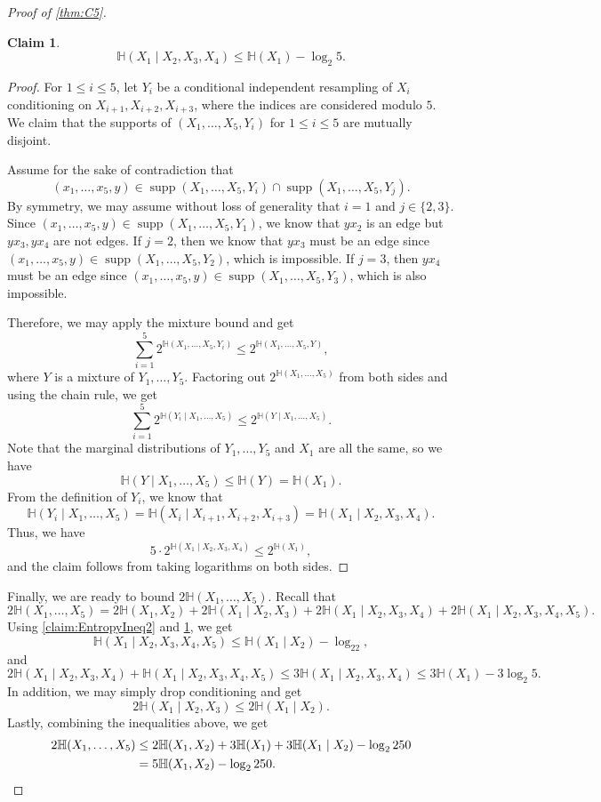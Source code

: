 \documentclass[reqno,11pt]{amsart}
\numberwithin{equation}{section}
\newtheorem{claim}[theorem]{Claim}
\theoremstyle{definition}
\theoremstyle{remark}
\DeclareMathOperator{\supp}{supp}
\newcommand{\HH}{\mathbb{H}}
\begin{document}
\begin{proof}[Proof of \cref{thm:C5}]
\begin{claim}\label{claim:EntropyIneq1}
    \[\HH(X_1\mid X_2,X_3,X_4)\leq \HH(X_1)-\log_2 5.\]
\end{claim}
\begin{proof}
    For $1\leq i\leq 5$, let $Y_i$ be a conditional independent resampling of $X_i$ conditioning on $X_{i+1},X_{i+2},X_{i+3}$, where the indices are considered modulo $5$.
    We claim that the supports of $(X_1,\dots,X_5,Y_i)$ for $1\leq i\leq 5$ are mutually disjoint. 
        
    Assume for the sake of contradiction that 
    \[(x_1,\dots,x_5,y)\in \supp(X_1,\dots,X_5,Y_i)\cap\supp(X_1,\dots,X_5,Y_j).\]
    By symmetry, we may assume without loss of generality that $i=1$ and $j\in\{2,3\}$. Since $(x_1,\dots,x_5,y)\in \supp(X_1,\dots,X_5,Y_1)$, we know that $yx_2$ is an edge but $yx_3,yx_4$ are not edges. If $j=2$, then we know that $yx_3$ must be an edge since $(x_1,\dots,x_5,y)\in \supp(X_1,\dots,X_5,Y_2)$, which is impossible. If $j=3$, then $yx_4$ must be an edge since $(x_1,\dots,x_5,y)\in \supp(X_1,\dots,X_5,Y_3)$, which is also impossible.

    

    Therefore, we may apply the mixture bound and get 
    \[\sum_{i=1}^5 2^{\HH( X_1,\dots,X_5,Y_i)}\leq 2^{\HH( X_1,\dots,X_5,Y)},\]
    where $Y$ is a mixture of $Y_1,\dots,Y_5$. Factoring out $2^{\HH( X_1,\dots,X_5)}$ from both sides and using the chain rule, we get
    \[\sum_{i=1}^5 2^{\HH(Y_i\mid X_1,\dots,X_5)}\leq 2^{\HH(Y\mid X_1,\dots,X_5)}.\]
    Note that the marginal distributions of $Y_1,\dots,Y_5$ and $X_1$ are all the same, so we have 
    \[\HH(Y\mid X_1,\dots,X_5)\leq \HH(Y)=\HH(X_1).\]
    From the definition of $Y_i$, we know that 
    \[\HH(Y_i\mid X_1,\dots,X_5)=\HH(X_i\mid X_{i+1},X_{i+2},X_{i+3})=\HH(X_1\mid X_2,X_3,X_4).\]
    Thus, we have
    \[5\cdot 2^{\HH(X_1\mid X_2,X_3,X_4)}\leq 2^{\HH(X_1)},\]
    and the claim follows from taking logarithms on both sides.
\end{proof}


Finally, we are ready to bound $2\HH(X_1,\dots,X_5)$. 
Recall that
\[2\HH(X_1,\dots,X_5)=2\HH(X_1,X_2)+2\HH(X_1\mid X_2,X_3)+2\HH(X_1\mid X_2,X_3,X_4)+2\HH(X_1\mid X_2,X_3,X_4,X_5).\]
Using \cref{claim:EntropyIneq2} and \cref{claim:EntropyIneq1}, we get
\[\HH(X_1\mid X_2,X_3,X_4,X_5)\leq \HH(X_1\mid X_2)-\log_22,\]
and
\[2\HH(X_1\mid X_2,X_3,X_4)+\HH(X_1\mid X_2,X_3,X_4,X_5)\leq 3\HH(X_1\mid X_2,X_3,X_4)\leq 3\HH(X_1)-3\log_2 5.\]
In addition, we may simply drop conditioning and get
\[2\HH(X_1\mid X_2,X_3)\leq 2\HH(X_1\mid X_2).\]
Lastly, combining the inequalities above, we get 
\begin{align*}
    2\HH(X_1,\dots,X_5)&\leq 2\HH(X_1,X_2)+3\HH(X_1)+3\HH(X_1\mid X_2)-\log_2 250\\
    &=5\HH(X_1,X_2)-\log_2 250.\qedhere
\end{align*}

\end{proof}
\end{document}
